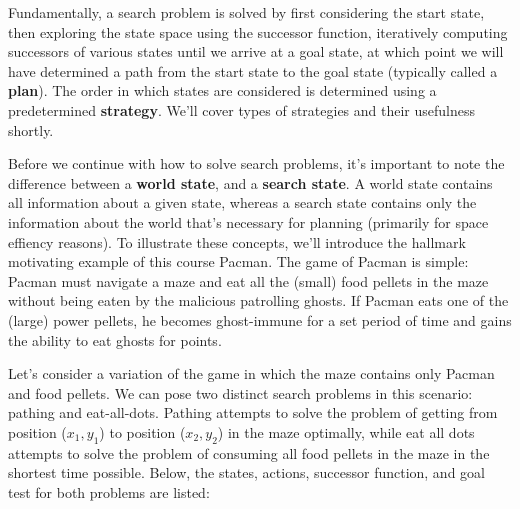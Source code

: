 \documentclass{article}[letterpaper]
\begin{document}
Fundamentally, a search problem is solved by first considering the start state, then exploring the state space using the successor function, iteratively computing successors of various states until we arrive at a goal state, at which point we will have determined a path from the start state to the goal state (typically called a \textbf{plan}). The order in which states are considered is determined using a predetermined \textbf{strategy}. We’ll cover types of strategies and their usefulness shortly. 

Before we continue with how to solve search problems, it’s important to note the difference between a \textbf{world state}, and a \textbf{search state}. A world state contains all information about a given state, whereas a search state contains only the information about the world that’s necessary for planning (primarily for space effiency reasons). To illustrate these concepts, we’ll introduce the hallmark motivating example of this course Pacman. The game of Pacman is simple: Pacman must navigate a maze and eat all the (small) food pellets in the maze without being eaten by the malicious patrolling ghosts. If Pacman eats one of the (large) power pellets, he becomes ghost-immune for a set period of time and gains the ability to eat ghosts for points.


Let’s consider a variation of the game in which the maze contains only Pacman and food pellets. We can pose two distinct search problems in this scenario: pathing and eat-all-dots. Pathing attempts to solve the problem of getting from position ($x_1,y_1$) to position ($x_2,y_2$) in the maze optimally, while eat all dots attempts to solve the problem of consuming all food pellets in the maze in the shortest time possible. Below, the states, actions, successor function, and goal test for both problems are listed:
\end{document}
